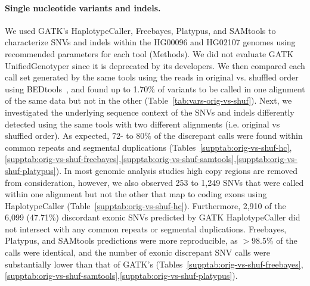 \documentclass{bioinfo}
\begin{document}
\paragraph{Single nucleotide variants and indels.}
We used GATK's HaplotypeCaller, Freebayes, Platypus, and SAMtools to characterize
SNVs and indels within the HG00096 and HG02107 genomes using recommended parameters for each tool (Methods). 
We did not evaluate GATK UnifiedGenotyper since it is deprecated by its developers.
We then compared each call set generated by the same tools using the reads in original vs. shuffled order using BEDtools~\citep{Quinlan2010a}, and found up to 1.70\% of variants to be called in one alignment of the same data but not in the other (Table~\ref{tab:vars-orig-vs-shuf}).
Next, we investigated the underlying sequence context of the SNVs 
and indels differently detected using the same tools with two different alignments (i.e. original vs shuffled order). 
As expected, 72- to 80\% of the discrepant calls were found within common repeats and segmental duplications (Tables~\ref{supptab:orig-vs-shuf-hc},\ref{supptab:orig-vs-shuf-freebayes},\ref{supptab:orig-vs-shuf-samtools},\ref{supptab:orig-vs-shuf-platypus}). 
In most genomic analysis studies high copy regions are removed from consideration, however, we also observed 253 to 1,249 
SNVs that were called within one alignment but not the other that map to coding exons using HaplotypeCaller (Table~\ref{supptab:orig-vs-shuf-hc}). 
Furthermore, 2,910 of the 6,099 (47.71\%) discordant exonic SNVs predicted by GATK HaplotypeCaller did not intersect with any common repeats or segmental duplications.
Freebayes, Platypus, and SAMtools predictions were more reproducible, as $>$98.5\% of the calls were identical, and the number of exonic discrepant SNV calls were substantially lower than
that of GATK's (Tables~\ref{supptab:orig-vs-shuf-freebayes},\ref{supptab:orig-vs-shuf-samtools},\ref{supptab:orig-vs-shuf-platypus}). 
\end{document}
